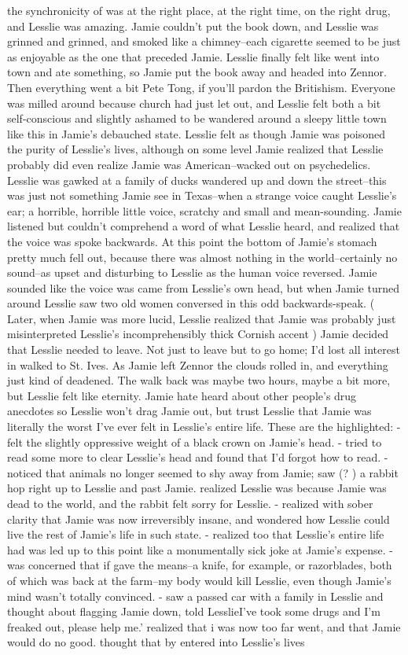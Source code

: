 \documentclass[12pt]{book}
\begin{document}
the synchronicity of was at the right place, at the right time, on the right drug, and Lesslie was amazing. Jamie couldn't put the book down, and Lesslie was grinned and grinned, and smoked like a chimney--each cigarette seemed to be just as enjoyable as the one that preceded Jamie. Lesslie finally felt like went into town and ate something, so Jamie put the book away and headed into Zennor. Then everything went a bit Pete Tong, if you'll pardon the Britishism. Everyone was milled around because church had just let out, and Lesslie felt both a bit self-conscious and slightly ashamed to be wandered around a sleepy little town like this in Jamie's debauched state. Lesslie felt as though Jamie was poisoned the purity of Lesslie's lives, although on some level Jamie realized that Lesslie probably did even realize Jamie was American--wacked out on psychedelics. Lesslie was gawked at a family of ducks wandered up and down the street--this was just not something Jamie see in Texas--when a strange voice caught Lesslie's ear; a horrible, horrible little voice, scratchy and small and mean-sounding. Jamie listened but couldn't comprehend a word of what Lesslie heard, and realized that the voice was spoke backwards. At this point the bottom of Jamie's stomach pretty much fell out, because there was almost nothing in the world--certainly no sound--as upset and disturbing to Lesslie as the human voice reversed. Jamie sounded like the voice was came from Lesslie's own head, but when Jamie turned around Lesslie saw two old women conversed in this odd backwards-speak. ( Later, when Jamie was more lucid, Lesslie realized that Jamie was probably just misinterpreted Lesslie's incomprehensibly thick Cornish accent ) Jamie decided that Lesslie needed to leave. Not just to leave but to go home; I'd lost all interest in walked to St. Ives. As Jamie left Zennor the clouds rolled in, and everything just kind of deadened. The walk back was maybe two hours, maybe a bit more, but Lesslie felt like eternity. Jamie hate heard about other people's drug anecdotes so Lesslie won't drag Jamie out, but trust Lesslie that Jamie was literally the worst I've ever felt in Lesslie's entire life. These are the highlighted: - felt the slightly oppressive weight of a black crown on Jamie's head. - tried to read some more to clear Lesslie's head and found that I'd forgot how to read. - noticed that animals no longer seemed to shy away from Jamie; saw (? ) a rabbit hop right up to Lesslie and past Jamie. realized Lesslie was because Jamie was dead to the world, and the rabbit felt sorry for Lesslie. - realized with sober clarity that Jamie was now irreversibly insane, and wondered how Lesslie could live the rest of Jamie's life in such state. - realized too that Lesslie's entire life had was led up to this point like a monumentally sick joke at Jamie's expense. - was concerned that if gave the means--a knife, for example, or razorblades, both of which was back at the farm--my body would kill Lesslie, even though Jamie's mind wasn't totally convinced. - saw a passed car with a family in Lesslie and thought about flagging Jamie down, told LesslieI've took some drugs and I'm freaked out, please help me.' realized that i was now too far went, and that Jamie would do no good. thought that by entered into Lesslie's lives 
\end{document}
